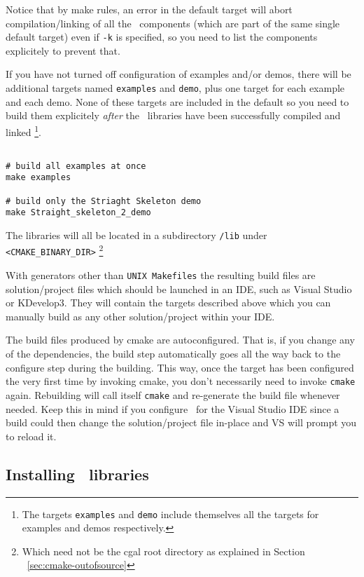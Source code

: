Notice that by make rules, an error in the default target will abort compilation/linking of
all the \cgal\ components (which are part of the same single default target) even if {\tt -k} 
is specified, so you need to list the components explicitely to prevent that.

If you have not turned off configuration of examples and/or demos, there will be additional
targets named {\tt examples} and {\tt demo}, plus one target for each example and each demo.
None of these targets are included in the default so you need to build them explicitely
{\em after} the \cgal\ libraries have been successfully compiled and linked
\footnote{The targets {\tt examples} and {\tt demo} include themselves all the targets
for examples and demos respectively.}.

{\ccTexHtml{\scriptsize}{}
\begin{verbatim}

# build all examples at once
make examples 

# build only the Striaght Skeleton demo
make Straight_skeleton_2_demo

\end{verbatim}
}

The libraries will all be located in a subdirectory {\tt /lib} under {\tt <CMAKE\_BINARY\_DIR>}
\footnote{Which need not be the cgal root directory as explained in Section ~\ref{sec:cmake-outofsource}}

With generators other than {\tt UNIX Makefiles} the resulting build files are solution/project files which
should be launched in an IDE, such as Visual Studio or KDevelop3. They will contain the targets described
above which you can manually build as any other solution/project within your IDE.

\begin{ccAdvanced}
The build files produced by cmake are autoconfigured. That is, if you change any 
of the dependencies, the build step automatically goes all the way back to the configure step
during the building. This way, once the target has been configured the very first time by
invoking cmake, you don't necessarily need to invoke \texttt{cmake} again. Rebuilding will call
itself \texttt{cmake} and re-generate the build file whenever needed. Keep this in mind if you
configure \cgal\ for the Visual Studio IDE since a build could then change the solution/project 
file in-place and VS will prompt you to reload it.
\end{ccAdvanced}


\subsection{Installing \cgal\ libraries}



